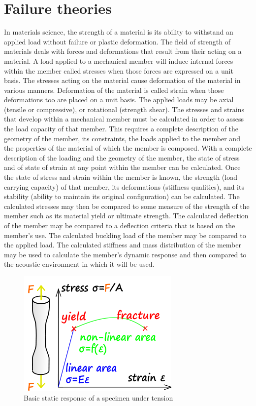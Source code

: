 
\chapter{Failure theories}
In materials science, the strength of a material is its ability to withstand an applied load without failure or plastic deformation. The field of strength of materials deals with forces and deformations that result from their acting on a material. A load applied to a mechanical member will induce internal forces within the member called stresses when those forces are expressed on a unit basis. The stresses acting on the material cause deformation of the material in various manners. Deformation of the material is called strain when those deformations too are placed on a unit basis. The applied loads may be axial (tensile or compressive), or rotational (strength shear). The stresses and strains that develop within a mechanical member must be calculated in order to assess the load capacity of that member. This requires a complete description of the geometry of the member, its constraints, the loads applied to the member and the properties of the material of which the member is composed. With a complete description of the loading and the geometry of the member, the state of stress and of state of strain at any point within the member can be calculated. Once the state of stress and strain within the member is known, the strength (load carrying capacity) of that member, its deformations (stiffness qualities), and its stability (ability to maintain its original configuration) can be calculated. The calculated stresses may then be compared to some measure of the strength of the member such as its material yield or ultimate strength. The calculated deflection of the member may be compared to a deflection criteria that is based on the member's use. The calculated buckling load of the member may be compared to the applied load. The calculated stiffness and mass distribution of the member may be used to calculate the member's dynamic response and then compared to the acoustic environment in which it will be used. \\

\begin{figure}[h!]
	\centering
	\includegraphics[width=0.5\linewidth]{figure/tension_test}
	\caption{Basic static response of a specimen under tension}
	\label{fig:tensiontest}
\end{figure}

